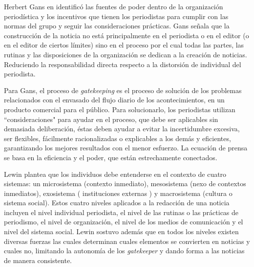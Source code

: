 
Herbert Gans en \cite{gans1979deciding} identificó las fuentes de poder dentro de la organización periodística y los incentivos que tienen los periodistas para cumplir con las normas del grupo y seguir las consideraciones prácticas. Gans señala que la construcción de la noticia no está principalmente en el periodista o en el editor (o en el editor de ciertos límites) sino en el proceso por el cual todas las partes, las rutinas y las disposiciones de la organización se dedican a la creación de noticias. Reduciendo la responsabilidad directa respecto a la distorsión de individual del periodista.

Para Gans, el proceso de \emph{gatekeeping} es el proceso de solución de los problemas relacionados con el envasado del flujo diario de los acontecimientos, en un producto comercial para el público. Para solucionarlo, los periodistas utilizan ``consideraciones" para ayudar en el proceso, que debe ser aplicables sin demasiada deliberación, éstas deben ayudar a evitar la incertidumbre excesiva, ser flexibles, fácilmente racionalizadas o explicables a los demás y eficientes, garantizando los mejores resultados con el menor esfuerzo. La ecuación de prensa se basa en la eficiencia y el poder, que están estrechamente conectados.

Lewin \cite{lewin1951field} plantea que los individuos debe entenderse en el contexto de cuatro sistemas: un microsistema (contexto inmediato), mesosistema (nexo de contextos inmediatos), exosistema ( instituciones externas ) y macrosistema (cultura o sistema social). Estos cuatro niveles aplicados a la redacción de una noticia incluyen el nivel individual periodista, el nivel de las rutinas o las prácticas de periodismo, el nivel de organización, el nivel de los medios de comunicación y el nivel del sistema social. Lewin sostuvo además que en todos los niveles existen diversas fuerzas las cuales determinan cuales elementos se convierten en noticias y cuales no, limitando la autonomía de los \emph{gatekeeper} y dando forma a las noticias de manera consistente.

